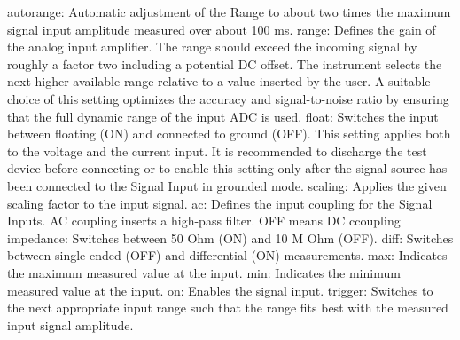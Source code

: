 \documentclass[11pt]{article} %
\begin{document}
            autorange: Automatic adjustment of the Range to about two times the maximum 
                signal input amplitude measured over about 100 ms.
            range: Defines the gain of the analog input amplifier. The range should 
                exceed the incoming signal by roughly a factor two including a 
                potential DC offset. The instrument selects the next higher available
                range relative to a value inserted by the user. A suitable choice of
                this setting optimizes the accuracy and signal-to-noise ratio by 
                ensuring that the full dynamic range of the input ADC is used.
            float: Switches the input between floating (ON) and connected to ground (OFF). 
                This setting applies both to the voltage and the current input. It
                is recommended to discharge the test device before connecting or to
                enable this setting only after the signal source has been connected
                to the Signal Input in grounded mode.
            scaling: Applies the given scaling factor to the input signal.
            ac: Defines the input coupling for the Signal Inputs. 
                AC coupling inserts a high-pass filter. OFF means DC ccoupling
            impedance: Switches between 50 Ohm (ON) and 10 M Ohm (OFF).
            diff: Switches between single ended (OFF) and differential (ON) measurements.
            max: Indicates the maximum measured value at the input.
            min: Indicates the minimum measured value at the input.
            on: Enables the signal input.
            trigger: Switches to the next appropriate input range such that the range 
                fits best with the measured input signal amplitude.
\end{document}
